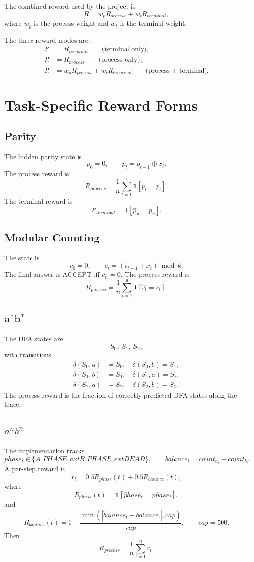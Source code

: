 \documentclass[11pt]{article}
\begin{document}
The combined reward used by the project is
\[
R = w_p R_{process} + w_t R_{terminal},
\]
where $w_p$ is the process weight and $w_t$ is the terminal weight.

The three reward modes are:
\begin{align*}
R &= R_{terminal} \qquad \text{(terminal only)},\\
R &= R_{process} \qquad \text{(process only)},\\
R &= w_p R_{process} + w_t R_{terminal} \qquad \text{(process + terminal)}.
\end{align*}

\section{Task-Specific Reward Forms}

\subsection{Parity}
The hidden parity state is
\[
p_0 = 0, \qquad p_t = p_{t-1} \oplus x_t.
\]
The process reward is
\[
R_{process} = \frac1n \sum_{t=1}^{n} \mathbf{1}[\hat p_t = p_t].
\]
The terminal reward is
\[
R_{terminal} = \mathbf{1}[\hat p_n = p_n].
\]

\subsection{Modular Counting}
The state is
\[
c_0 = 0, \qquad c_t = (c_{t-1}+x_t) \bmod k.
\]
The final answer is ACCEPT iff $c_n=0$.
The process reward is
\[
R_{process} = \frac1n \sum_{t=1}^{n} \mathbf{1}[\hat c_t = c_t].
\]

\subsection{a$^*$b$^*$}
The DFA states are
\[
S_0,\ S_1,\ S_2,
\]
with transitions
\begin{align*}
\delta(S_0,a)&=S_0,\quad \delta(S_0,b)=S_1,\\
\delta(S_1,b)&=S_1,\quad \delta(S_1,a)=S_2,\\
\delta(S_2,a)&=S_2,\quad \delta(S_2,b)=S_2.
\end{align*}
The process reward is the fraction of correctly predicted DFA states along the trace.

\subsection{$a^n b^n$}
The implementation tracks
\[
phase_t \in \{A\_PHASE,	ext{ }B\_PHASE,	ext{ }DEAD\},
\qquad balance_t = count_a_t - count_b_t.
\]
A per-step reward is
\[
 r_t = 0.5 R_{phase}(t) + 0.5 R_{balance}(t),
\]
where
\[
R_{phase}(t)=\mathbf{1}[\hat phase_t = phase_t],
\]
and
\[
R_{balance}(t)=1-\frac{\min(|\hat balance_t-balance_t|,cap)}{cap},\qquad cap=500.
\]
Then
\[
R_{process} = \frac1n \sum_{t=1}^{n} r_t.
\]
\end{document}
